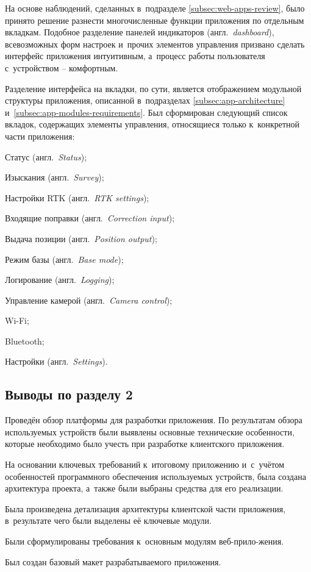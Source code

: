 На основе наблюдений, сделанных в~подразделе \ref{subsec:web-apps-review}, было принято решение разнести многочисленные функции приложения по отдельным вкладкам. Подобное разделение панелей индикаторов (англ.~\emph{dashboard}), всевозможных форм настроек и~прочих элементов управления призвано сделать интерфейс приложения интуитивным, а~процесс работы пользователя с~устройством -- комфортным.

Разделение интерфейса на вкладки, по сути, является отображением модульной структуры приложения, описанной в~подразделах \ref{subsec:app-architecture} и~\ref{subsec:app-modules-requirements}. Был сформирован следующий список вкладок, содержащих элементы управления, относящиеся только к~конкретной части приложения:

\begin{dashitemize}
  \item Статус (англ.~\emph{Status});
  \item Изыскания (англ.~\emph{Survey});
  \item Настройки RTK (англ.~\emph{RTK settings});
  \item Входящие поправки (англ.~\emph{Correction input});
  \item Выдача позиции (англ.~\emph{Position output});
  \item Режим базы (англ.~\emph{Base mode});
  \item Логирование (англ.~\emph{Logging});
  \item Управление камерой (англ.~\emph{Camera control});
  \item Wi-Fi;
  \item Bluetooth;
  \item Настройки (англ.~\emph{Settings}).
\end{dashitemize}


\subsection{Выводы по разделу 2}

\begin{dashitemize}
  \item Проведён обзор платформы для разработки приложения. По результатам обзора используемых устройств были выявлены основные технические особенности, которые необходимо было учесть при разработке клиентского приложения.
  \item На основании ключевых требований к~итоговому приложению и~с~учётом особенностей программного обеспечения используемых устройств, была создана архитектура проекта, а~также были выбраны средства для его реализации.
  \item Была произведена детализация архитектуры клиентской части приложения, в~результате чего были выделены её ключевые модули.
  \item Были сформулированы требования к~основным модулям веб-прило-жения.
  \item Был создан базовый макет разрабатываемого приложения.
\end{dashitemize}

\newpage
